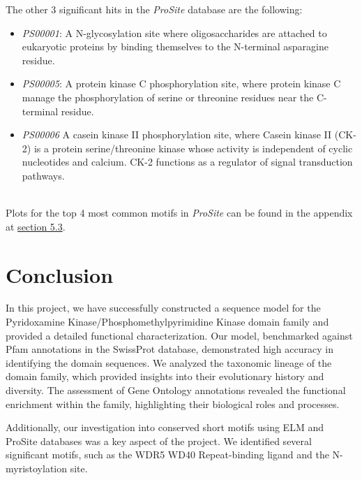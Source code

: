 \documentclass[10pt,twocolumn,letterpaper]{article}
\begin{document}
The other 3 significant hits in the \textit{ProSite} database are the following: 
\begin{itemize}
\item \textit{PS00001}: A N-glycosylation site where oligosaccharides are attached to eukaryotic proteins by binding themselves to the N-terminal asparagine residue.\cite{N-glycosylation}
\item \textit{PS00005}: A protein kinase C phosphorylation site, where protein kinase C manage the phosphorylation of serine or threonine residues near the C-terminal residue.\cite{kinase}
\item \textit{PS00006} A casein kinase II phosphorylation site, where Casein kinase II (CK-2) is a protein serine/threonine kinase whose activity is independent of cyclic nucleotides and calcium. CK-2 functions as a regulator of signal transduction pathways.\cite{kinase2}
\end{itemize} \\

Plots for the top 4 most common motifs in \textit{ProSite} can be found in the appendix at \hyperref[sec:prosite_motifs]{section 5.3}.

\section{Conclusion}

In this project, we have successfully constructed a sequence model for the Pyridoxamine Kinase/Phosphomethylpyrimidine Kinase domain family and provided a detailed functional characterization. Our model, benchmarked against Pfam annotations in the SwissProt database, demonstrated high accuracy in identifying the domain sequences. We analyzed the taxonomic lineage of the domain family, which provided insights into their evolutionary history and diversity. The assessment of Gene Ontology annotations revealed the functional enrichment within the family, highlighting their biological roles and processes.

Additionally, our investigation into conserved short motifs using ELM and ProSite databases was a key aspect of the project. We identified several significant motifs, such as the WDR5 WD40 Repeat-binding ligand and the N-myristoylation site.



{\small


}

\clearpage %
\onecolumn %
\end{document}
